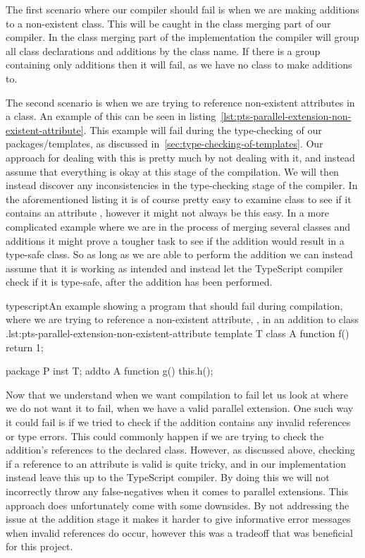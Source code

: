 The first scenario where our compiler should fail is when we are making additions to a non-existent class.
This will be caught in the class merging part of our compiler.
In the class merging part of the implementation the compiler will group all class declarations and additions by the class name.
If there is a group containing only additions then it will fail, as we have no class to make additions to.

The second scenario is when we are trying to reference non-existent attributes in a class.
An example of this can be seen in listing~\vref{lst:pts-parallel-extension-non-existent-attribute}.
This example will fail during the type-checking of our packages/templates, as discussed in~\vref{sec:type-checking-of-templates}.
Our approach for dealing with this is pretty much by not dealing with it, and instead assume that everything is okay at this stage of the compilation.
We will then instead discover any inconsistencies in the type-checking stage of the compiler.
In the aforementioned listing it is of course pretty easy to examine class  to see if it contains an attribute , however it might not always be this easy.
In a more complicated example where we are in the process of merging several classes and additions it might prove a tougher task to see if the addition would result in a type-safe class.
So as long as we are able to perform the addition we can instead assume that it is working as intended and instead let the TypeScript compiler check if it is type-safe, after the addition has been performed.

\begin{code}{typescript}{An example showing a program that should fail during compilation, where we are trying to reference a non-existent attribute, , in an addition to class .}{lst:pts-parallel-extension-non-existent-attribute}
    template T {
        class A {
            function f() {
                return 1;
            }
        }
    }

    package P {
        inst T;
        addto A {
            function g() {
                this.h();
            }
        }
    }
\end{code}

Now that we understand when we want compilation to fail let us look at where we do not want it to fail, when we have a valid parallel extension.
One such way it could fail is if we tried to check if the addition contains any invalid references or type errors.
This could commonly happen if we are trying to check the addition's references to the declared class.
However, as discussed above, checking if a reference to an attribute is valid is quite tricky, and in our implementation instead leave this up to the TypeScript compiler.
By doing this we will not incorrectly throw any false-negatives when it comes to parallel extensions.
This approach does unfortunately come with some downsides.
By not addressing the issue at the addition stage it makes it harder to give informative error messages when invalid references do occur, however this was a tradeoff that was beneficial for this project.

